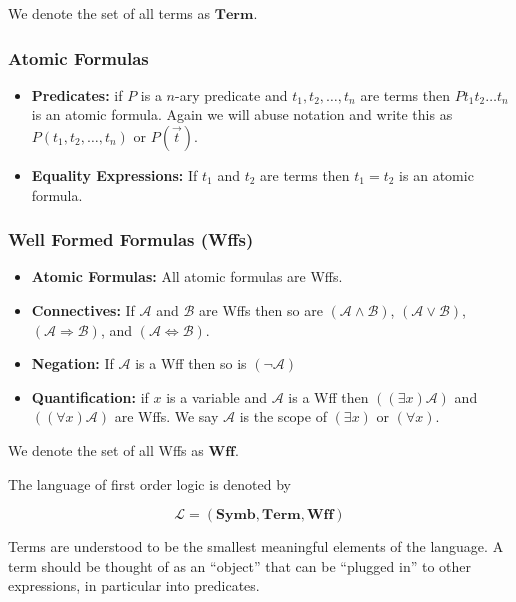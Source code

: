 \documentclass[12pt]{article}
\newcommand{\bv}[1]{\boldsymbol{#1}}
\newcommand{\mc}[1]{\mathcal{#1}}
\newcommand{\bc}[1]{\bv{\mc{#1}}}
\begin{document}
We denote the set of all terms as $\mathbf{Term}$.

\hrulefill
\subsubsection*{Atomic Formulas}
\begin{itemize}
\item{\textbf{Predicates:} if $P$ is a $n$-ary predicate and $t_1,t_2,\ldots,t_n$ are terms then $Pt_1t_2\ldots t_n$ is an atomic formula. Again we will abuse notation and write this as $P(t_1,t_2,\ldots,t_n)$ or $P(\vec{t})$.}
\item{\textbf{Equality Expressions:} If $t_1$ and $t_2$ are terms then $t_1=t_2$ is an atomic formula.}
\end{itemize}
\hrulefill
\subsubsection*{Well Formed Formulas (Wffs)}
\begin{itemize}
\item{\textbf{Atomic Formulas:} All atomic formulas are Wffs.}
\item{\textbf{Connectives:} If $\mc{A}$ and $\mc{B}$ are Wffs then so are $(\mc{A}\land\mc{B})$, $(\mc{A} \lor \mc{B})$, $(\mc{A}\Rightarrow\mc{B})$, and $(\mc{A}\Leftrightarrow\mc{B})$.}
\item{\textbf{Negation:} If $\mc{A}$ is a Wff then so is $(\lnot\mc{A})$}
\item{\textbf{Quantification:} if $x$ is a variable and $\mc{A}$ is a Wff then $((\exists x)\mc{A})$ and $((\forall x)\mathcal{A})$ are Wffs. We say $\mc{A}$ is the scope of $(\exists x)$ or $(\forall x)$.}
\end{itemize}

We denote the set of all Wffs as $\mathbf{Wff}$.

\hrulefill

The language of first order logic is denoted by

\begin{equation}
\bc{L} = (\mathbf{Symb},\mathbf{Term},\mathbf{Wff})
\end{equation}

Terms are understood to be the smallest meaningful elements of the language. A term should be thought of as an ``object'' that can be ``plugged in'' to other expressions, in particular into predicates. 
\end{document}
